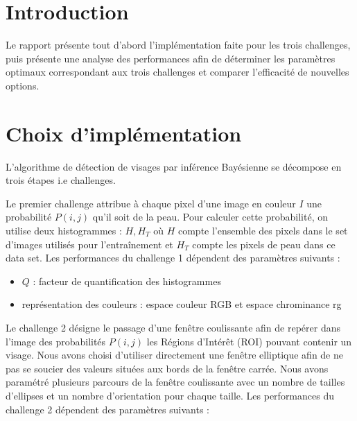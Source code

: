\documentclass[a4paper,12pt, openany]{book}
\theoremstyle{break}
\begin{document}

\frontmatter

\clearpage

\tableofcontents

\clearpage

\listoffigures

\clearpage


\mainmatter
\pagestyle{fancy}


\section*{Introduction}
Le rapport présente tout d'abord l'implémentation faite pour les trois challenges, puis présente une analyse des performances afin de déterminer les paramètres optimaux correspondant aux trois challenges et comparer l'efficacité de nouvelles options.

\section{Choix d'implémentation}
L'algorithme de détection de visages par inférence Bayésienne se décompose en trois étapes i.e challenges.

Le premier challenge attribue à chaque pixel d'une image en couleur $I$ une probabilité $P(i,j)$ qu'il soit de la peau. Pour calculer cette probabilité, on utilise deux histogrammes : $H, H_T$ où $H$ compte l'ensemble des pixels dans le set d'images utilisés pour l'entraînement et $H_T$ compte les pixels de peau dans ce data set. Les performances du challenge 1 dépendent des paramètres suivants :

\begin{itemize}
  \item $Q$ : facteur de quantification des histogrammes
  \item représentation des couleurs : espace couleur RGB et espace chrominance rg
\end{itemize}

Le challenge 2 désigne le passage d'une fenêtre coulissante afin de repérer dans l'image des probabilités $P(i,j)$ les Régions d'Intérêt (ROI) pouvant contenir un visage. Nous avons choisi d'utiliser directement une fenêtre elliptique afin de ne pas se soucier des valeurs situées aux bords de la fenêtre carrée. Nous avons paramétré plusieurs parcours de la fenêtre coulissante avec un nombre de tailles d'ellipses et un nombre d'orientation pour chaque taille. Les performances du challenge 2 dépendent des paramètres suivants :
\end{document}
